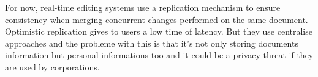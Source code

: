 For now, real-time editing systems use a replication mechanism to ensure consistency when merging concurrent changes performed on the same document. Optimistic replication gives to users a low time of latency. But they use centralise approaches and the probleme with this is that it's not only storing documents information but personal informations too and it could be a privacy threat if they are used by corporations.